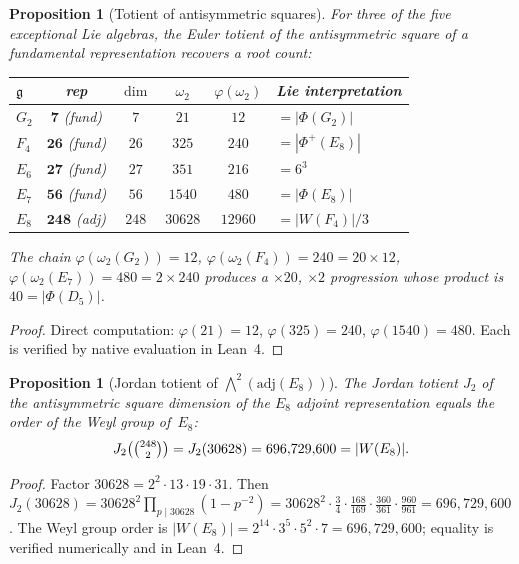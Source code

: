 \documentclass[11pt]{amsart}
\theoremstyle{plain}
\newtheorem{proposition}[theorem]{Proposition}
\theoremstyle{definition}
\theoremstyle{remark}
\newcommand{\fg}{\mathfrak{g}}
\renewcommand{\Phi}{\varPhi}
\begin{document}
\begin{proposition}[Totient of antisymmetric squares]\label{prop:phi-wedge2}
For three of the five exceptional Lie algebras, the Euler totient of the
antisymmetric square of a fundamental representation recovers a root count:
\begin{center}
\renewcommand{\arraystretch}{1.15}
\begin{tabular}{lccccl}
\toprule
$\fg$ & rep & $\dim$ & $\omega_2$ & $\varphi(\omega_2)$ & Lie interpretation \\
\midrule
$G_2$ & $\mathbf{7}$ (fund) & $7$ & $21$ & $12$ & $= |\Phi(G_2)|$ \\
$F_4$ & $\mathbf{26}$ (fund) & $26$ & $325$ & $240$ & $= |\Phi^+(E_8)|$ \\
$E_6$ & $\mathbf{27}$ (fund) & $27$ & $351$ & $216$ & $= 6^3$ \\
$E_7$ & $\mathbf{56}$ (fund) & $56$ & $1540$ & $480$ & $= |\Phi(E_8)|$ \\
$E_8$ & $\mathbf{248}$ (adj) & $248$ & $30628$ & $12960$ & $= |W(F_4)|/3$ \\
\bottomrule
\end{tabular}
\end{center}
The chain $\varphi(\omega_2(G_2)) = 12$,
$\varphi(\omega_2(F_4)) = 240 = 20 \times 12$,
$\varphi(\omega_2(E_7)) = 480 = 2 \times 240$
produces a $\times 20$, $\times 2$ progression whose product is~$40 = |\Phi(D_5)|$.
\end{proposition}

\begin{proof}
Direct computation: $\varphi(21) = 12$, $\varphi(325) = 240$,
$\varphi(1540) = 480$.  Each is verified by native evaluation in Lean~4.
\end{proof}

\begin{proposition}[Jordan totient of $\bigwedge^2(\mathrm{adj}(E_8))$]%
\label{prop:J2-wedge2-E8}
The Jordan totient $J_2$ of the antisymmetric square dimension of the
$E_8$ adjoint representation equals the order of the Weyl group of~$E_8$:
\[
  J_2\!\left(\tbinom{248}{2}\right) = J_2(30628) = 696{,}729{,}600
  = |W(E_8)|.
\]
\end{proposition}

\begin{proof}
Factor $30628 = 2^2 \cdot 13 \cdot 19 \cdot 31$.  Then
$J_2(30628) = 30628^2 \prod_{p \mid 30628}(1 - p^{-2})
= 30628^2 \cdot \tfrac{3}{4} \cdot \tfrac{168}{169} \cdot
\tfrac{360}{361} \cdot \tfrac{960}{961}
= 696{,}729{,}600$.
The Weyl group order is $|W(E_8)| = 2^{14} \cdot 3^5 \cdot 5^2 \cdot 7
= 696{,}729{,}600$; equality is verified numerically and in Lean~4.
\end{proof}
\end{document}

